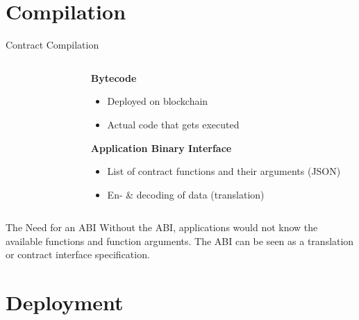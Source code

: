 \documentclass[]{beamer}
\begin{document}

\section{Compilation}

\begin{frame}{Contract Compilation}

	\begin{columns}
		\begin{column}{0.6\textwidth}
			\begin{figure}[h!]
				\center
					
			\end{figure}\vspace{1em}
		\end{column}
		
		\begin{column}{0.5\textwidth}
			\textbf{Bytecode}
				\begin{itemize}
					\item Deployed on blockchain
					\item Actual code that gets executed
				\end{itemize}
		\vspace{1em}
			\textbf{Application Binary Interface}
				\begin{itemize}
					\item List of contract functions and their arguments (JSON)
					\item En- \& decoding of data (translation) 
				\end{itemize}
		\end{column}
	\end{columns}

	\begin{keytakeaway}{The Need for an ABI}
		 Without the ABI, applications would not know the available functions and function arguments. The ABI can be seen as a translation or contract interface specification.
	\end{keytakeaway}		

\end{frame}


\section{Deployment}
\end{document}
